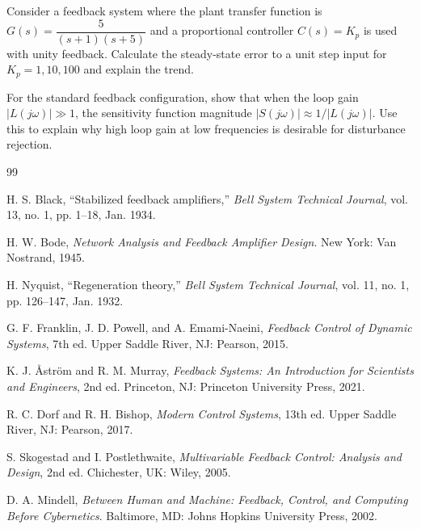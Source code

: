 \begin{exercise}
Consider a feedback system where the plant transfer function is $G(s) = \dfrac{5}{(s+1)(s+5)}$ and a proportional controller $C(s) = K_p$ is used with unity feedback. Calculate the steady-state error to a unit step input for $K_p = 1, 10, 100$ and explain the trend.
\end{exercise}

\begin{exercise}
For the standard feedback configuration, show that when the loop gain $|L(j\omega)| \gg 1$, the sensitivity function magnitude $|S(j\omega)| \approx 1/|L(j\omega)|$. Use this to explain why high loop gain at low frequencies is desirable for disturbance rejection.
\end{exercise}


\begin{thebibliography}{99}

H. S. Black, ``Stabilized feedback amplifiers,'' \textit{Bell System Technical Journal}, vol. 13, no. 1, pp. 1--18, Jan. 1934.

H. W. Bode, \textit{Network Analysis and Feedback Amplifier Design}. New York: Van Nostrand, 1945.

H. Nyquist, ``Regeneration theory,'' \textit{Bell System Technical Journal}, vol. 11, no. 1, pp. 126--147, Jan. 1932.

G. F. Franklin, J. D. Powell, and A. Emami-Naeini, \textit{Feedback Control of Dynamic Systems}, 7th ed. Upper Saddle River, NJ: Pearson, 2015.

K. J. \r{A}str\"{o}m and R. M. Murray, \textit{Feedback Systems: An Introduction for Scientists and Engineers}, 2nd ed. Princeton, NJ: Princeton University Press, 2021.

R. C. Dorf and R. H. Bishop, \textit{Modern Control Systems}, 13th ed. Upper Saddle River, NJ: Pearson, 2017.

S. Skogestad and I. Postlethwaite, \textit{Multivariable Feedback Control: Analysis and Design}, 2nd ed. Chichester, UK: Wiley, 2005.

D. A. Mindell, \textit{Between Human and Machine: Feedback, Control, and Computing Before Cybernetics}. Baltimore, MD: Johns Hopkins University Press, 2002.

\end{thebibliography}

